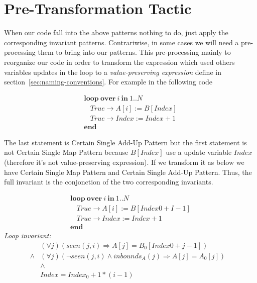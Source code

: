\documentclass[a4paper,10pt]{article}
\newcommand{\idx}{\ensuremath{i}\xspace}
\newcommand{\KWloop}{\ensuremath{\mathrm{\textbf{loop}}~}}
\newcommand{\KWend}{\ensuremath{\mathrm{\textbf{end}}~}}
\newcommand{\KWover}{\ensuremath{\mathrm{\textbf{over}}~}}
\newcommand{\KWin}{\ensuremath{~\mathrm{\textbf{in}}~}}
\newcommand{\inbounds}[2]{\ensuremath{\mathit{inbounds}_{#1}(#2)}\xspace}
\newcommand{\seen}[2]{\ensuremath{\mathit{seen}{(#1,#2)}}\xspace}
\newcommand{\loopinvariant}{\noindent\textit{Loop invariant:}\xspace}
\newcommand{\impl}{\ensuremath{\Longrightarrow}}
\begin{document}
\section{Pre-Transformation Tactic}
When our code fall into the above patterns nothing to do, just apply the corresponding invariant patterns. 
Contrariwise, in some cases we will need a pre-processing them to bring into our patterns. 
This pre-processing mainly to reorganize our code in order to transform the expression 
which used others variables updates in the loop to a \textit{value-preserving expression}  
define in section~\ref{sec:naming-conventions}. For example in the following code 

$$\begin{array}{l}
  \KWloop \KWover i \KWin 1 .. N \\
  ~~~~ True \rightarrow A[i] := B[Index]\\
  ~~~~ True \rightarrow Index := Index + 1\\
  \KWend
\end{array}$$

The last statement is Certain Single Add-Up Pattern but the first statement is not Certain Single Map Pattern
because $B[Index]$ use a update variable $Index$ (therefore it's not value-preserving expression). 
If we transform it as below we have Certain Single Map Pattern and Certain Single Add-Up Pattern. 
Thus, the full invariant is the conjonction of the two corresponding invariants.

$$\begin{array}{l}
  \KWloop \KWover i \KWin 1 .. N \\
  ~~~~ True \rightarrow A[i]   := B[Index0 + I-1]\\
  ~~~~ True \rightarrow Index := Index + 1\\
  \KWend
\end{array}$$
%
\loopinvariant
%
\begin{eqnarray*}
&(\forall j)(\seen{j}{\idx} \impl A[j] = B_0[Index0 + j-1]) \\
\land& (\forall j)(\neg \seen{j}{\idx} \land \inbounds{A}{j} \impl A[j] = A_0[j])\\
&\land& \\
&Index = Index_0 + 1 * (i-1)&
\end{eqnarray*}

\end{document}
